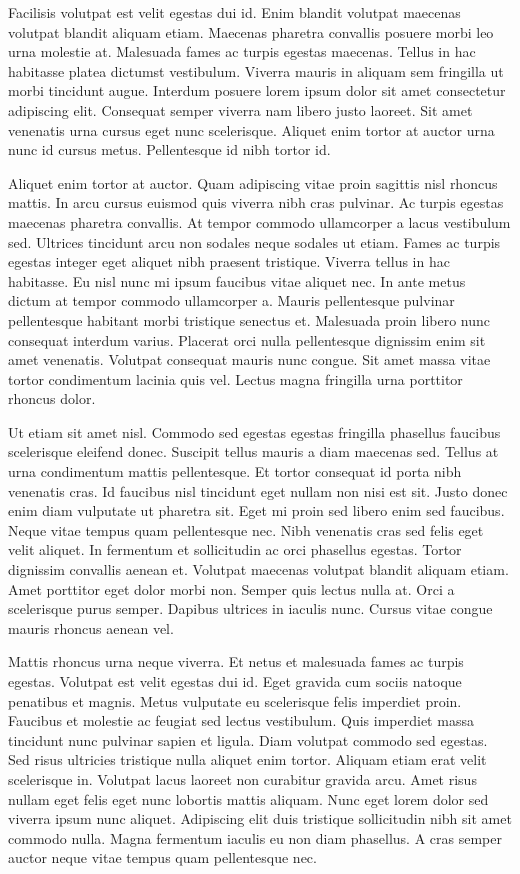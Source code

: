 \documentclass[titlepage,oneside]{book}
\begin{document}
Facilisis volutpat est velit egestas dui id. Enim blandit volutpat maecenas volutpat blandit aliquam etiam. Maecenas pharetra convallis posuere morbi leo urna molestie at. Malesuada fames ac turpis egestas maecenas. Tellus in hac habitasse platea dictumst vestibulum. Viverra mauris in aliquam sem fringilla ut morbi tincidunt augue. Interdum posuere lorem ipsum dolor sit amet consectetur adipiscing elit. Consequat semper viverra nam libero justo laoreet. Sit amet venenatis urna cursus eget nunc scelerisque. Aliquet enim tortor at auctor urna nunc id cursus metus. Pellentesque id nibh tortor id.

Aliquet enim tortor at auctor. Quam adipiscing vitae proin sagittis nisl rhoncus mattis. In arcu cursus euismod quis viverra nibh cras pulvinar. Ac turpis egestas maecenas pharetra convallis. At tempor commodo ullamcorper a lacus vestibulum sed. Ultrices tincidunt arcu non sodales neque sodales ut etiam. Fames ac turpis egestas integer eget aliquet nibh praesent tristique. Viverra tellus in hac habitasse. Eu nisl nunc mi ipsum faucibus vitae aliquet nec. In ante metus dictum at tempor commodo ullamcorper a. Mauris pellentesque pulvinar pellentesque habitant morbi tristique senectus et. Malesuada proin libero nunc consequat interdum varius. Placerat orci nulla pellentesque dignissim enim sit amet venenatis. Volutpat consequat mauris nunc congue. Sit amet massa vitae tortor condimentum lacinia quis vel. Lectus magna fringilla urna porttitor rhoncus dolor.

Ut etiam sit amet nisl. Commodo sed egestas egestas fringilla phasellus faucibus scelerisque eleifend donec. Suscipit tellus mauris a diam maecenas sed. Tellus at urna condimentum mattis pellentesque. Et tortor consequat id porta nibh venenatis cras. Id faucibus nisl tincidunt eget nullam non nisi est sit. Justo donec enim diam vulputate ut pharetra sit. Eget mi proin sed libero enim sed faucibus. Neque vitae tempus quam pellentesque nec. Nibh venenatis cras sed felis eget velit aliquet. In fermentum et sollicitudin ac orci phasellus egestas. Tortor dignissim convallis aenean et. Volutpat maecenas volutpat blandit aliquam etiam. Amet porttitor eget dolor morbi non. Semper quis lectus nulla at. Orci a scelerisque purus semper. Dapibus ultrices in iaculis nunc. Cursus vitae congue mauris rhoncus aenean vel.

Mattis rhoncus urna neque viverra. Et netus et malesuada fames ac turpis egestas. Volutpat est velit egestas dui id. Eget gravida cum sociis natoque penatibus et magnis. Metus vulputate eu scelerisque felis imperdiet proin. Faucibus et molestie ac feugiat sed lectus vestibulum. Quis imperdiet massa tincidunt nunc pulvinar sapien et ligula. Diam volutpat commodo sed egestas. Sed risus ultricies tristique nulla aliquet enim tortor. Aliquam etiam erat velit scelerisque in. Volutpat lacus laoreet non curabitur gravida arcu. Amet risus nullam eget felis eget nunc lobortis mattis aliquam. Nunc eget lorem dolor sed viverra ipsum nunc aliquet. Adipiscing elit duis tristique sollicitudin nibh sit amet commodo nulla. Magna fermentum iaculis eu non diam phasellus. A cras semper auctor neque vitae tempus quam pellentesque nec.
\end{document}

